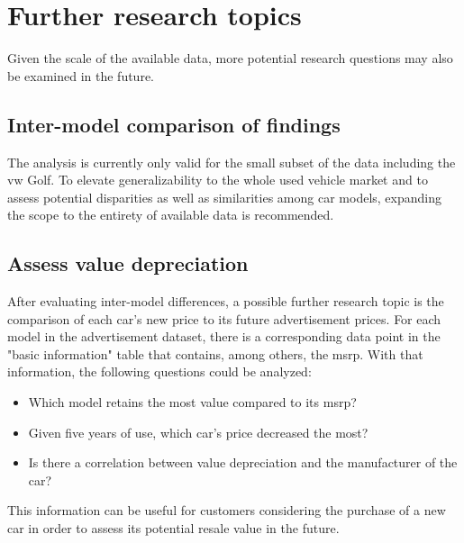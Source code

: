 \section{Further research topics}
Given the scale of the available data, more potential research questions may also be examined in the future. 

\subsection{Inter-model comparison of findings}
The analysis is currently only valid for the small subset of the data including the \ac{vw} Golf. 
To elevate generalizability to the whole used vehicle market and to assess potential disparities as well as similarities among
car models, expanding the scope to the entirety of available data is recommended.  
\subsection{Assess value depreciation}
After evaluating inter-model differences, a possible further research topic is the comparison of each car's new price
to its future advertisement prices. For each model in the advertisement dataset, there is a corresponding data point
in the "basic information" table that contains, among others, the \ac{msrp}. 
\newline
With that information, the following questions could be analyzed: 
\begin{itemize}
\item Which model retains the most value compared to its \ac{msrp}?
\item Given five years of use, which car's price decreased the most?
\item Is there a correlation between value depreciation and the manufacturer of the car?
\end{itemize}
This information can be useful for customers considering the purchase of a new car in order to assess its potential resale value in the future.
